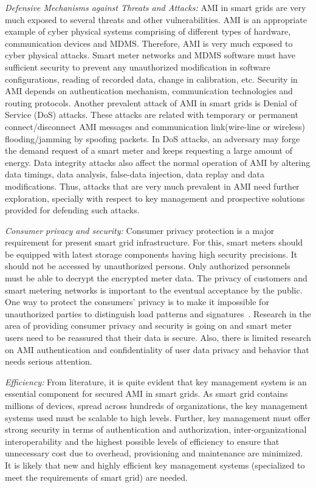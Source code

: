 \textit{Defensive Mechanisms against Threats and Attacks:} AMI in smart grids are very much exposed to several threats and other vulnerabilities. AMI is an appropriate example of cyber physical systems comprising of different types of hardware, communication devices and MDMS. Therefore, AMI is very much exposed to cyber physical attacks. Smart meter networks and MDMS software must have sufficient security to prevent any unauthorized modification in software configurations, reading of recorded data, change in calibration, etc. Security in AMI depends on authentication mechanism, communication technologies and routing protocols. Another prevalent attack of AMI in smart grids is Denial of Service (DoS) attacks. These attacks are related with temporary or
permanent connect/disconnect AMI messages and communication link(wire-line or wireless) flooding/jamming by spoofing packets. In DoS attacks, an adversary may forge the demand request of a smart meter and keeps requesting a large amount of energy. Data integrity attacks also affect the normal operation of AMI by altering data timings, data analysis, false-data injection, data replay and data modifications. Thus, attacks that are very much prevalent in AMI need further exploration, specially with respect to key management and prospective solutions provided for defending such attacks. 

\textit{Consumer privacy and security:} Consumer privacy protection is a major requirement for present smart grid infrastructure. For this, smart meters should be equipped with latest storage components having high security precisions. It should not be accessed by unauthorized persons. Only authorized personnels must be able to decrypt the encrypted meter data. The privacy of customers and smart metering networks is important to the eventual acceptance by the public. One way to protect the consumers’ privacy is to make it impossible for unauthorized parties to distinguish load patterns and signatures~\cite{Kalogridis10}. Research in the area of providing consumer privacy and security is going on and smart meter users need to be reassured that their data is secure. Also, there is limited research on AMI authentication and confidentiality of user data privacy and behavior that needs serious attention. 

\textit{Efficiency:} From literature, it is quite evident that key management system is an essential component for secured AMI in smart grids. As smart grid contains millions of devices, spread across hundreds of organizations, the key management systems used must be scalable to high levels. Further, key management must offer strong security in terms of authentication and authorization, inter-organizational interoperability and the highest possible levels of efficiency to ensure that unnecessary cost due to overhead, provisioning and maintenance are minimized. It is likely that new and highly efficient key management systems (specialized to meet the requirements of smart grid) are needed.

